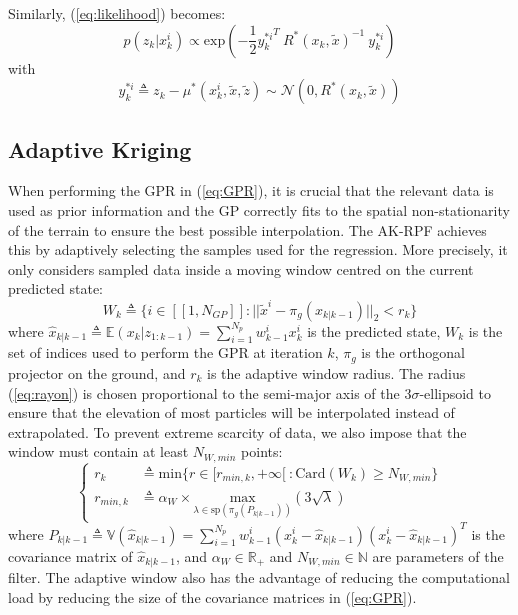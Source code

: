 \documentclass[conference]{IEEEtran}
\begin{document}
Similarly, (\ref{eq:likelihood}) becomes:
\begin{equation}
p(z_k|x_k^i) \propto \text{exp}\left(-\frac{1}{2}{y_k^{*i}}^T\:R^*(x_k, \tilde{x})^{-1}\:y_k^{*i}\right) \label{eq:likelihood GPR}
\end{equation}
with
\begin{equation}
y_k^{*i} \triangleq z_k - \mu^*\left(x_k^i, \tilde{x}, \tilde{z}\right) \sim \mathcal{N}(0, R^*(x_k, \tilde{x}))\label{eq:innovation GPR}
\end{equation}

\subsection{Adaptive Kriging}

When performing the GPR in (\ref{eq:GPR}), it is crucial that the relevant data is used as prior information and the GP correctly fits to the spatial non-stationarity of the terrain to ensure the best possible interpolation. The AK-RPF achieves this by adaptively selecting the samples used for the regression. More precisely, it only considers sampled data inside a moving window centred on the current predicted state:
\begin{equation}
W_k \triangleq \{i \in  [\![1, N_{GP}]\!] : ||\tilde x^i - \pi_g(\hat x_{k|k-1})||_2 < r_k\} \label{eq:fenêtre}
\end{equation}
where $\hat x_{k|k-1} \triangleq \mathbb{E}(x_k|z_{1:k-1}) = \sum_{i=1}^{N_p} w_{k-1}^i x_k^i$ is the predicted state, $W_k$ is the set of indices used to perform the GPR at iteration $k$, $\pi_g$ is the orthogonal projector on the ground, and $r_k$ is the adaptive window radius. The radius (\ref{eq:rayon}) is chosen proportional to the semi-major axis of the $3\sigma$-ellipsoid to ensure that the elevation of most particles will be interpolated instead of extrapolated. To prevent extreme scarcity of data, we also impose that the window must contain at least $N_{W,min}$ points:
\begin{equation}
\left\{
\begin{aligned}
r_k & \triangleq \text{min}\{r \in [r_{min,k}, +\infty[ \:: \text{Card}(W_k) \geq N_{W,min}\} \\
r_{min,k} & \triangleq \alpha_W \times \underset{\lambda \in \text{sp}(\pi_g(P_{k|k-1}))}{\text{max}}\left(3\sqrt{\lambda}\right)
\end{aligned}
\right. \label{eq:rayon}
\end{equation}
where $P_{k|k-1} \triangleq \mathbb{V}(\hat{x}_{k|k-1}) = \sum_{i=1}^{N_p} w_{k-1}^i (x_k^i - \hat x_{k|k-1}) (x_k^i - \hat x_{k|k-1})^T$ is the covariance matrix of $\hat{x}_{k|k-1}$, and $\alpha_W \in \mathbb{R}_+$ and $N_{W,min} \in \mathbb{N}$ are parameters of the filter. The adaptive window also has the advantage of reducing the computational load by reducing the size of the covariance matrices in (\ref{eq:GPR}).
\end{document}

